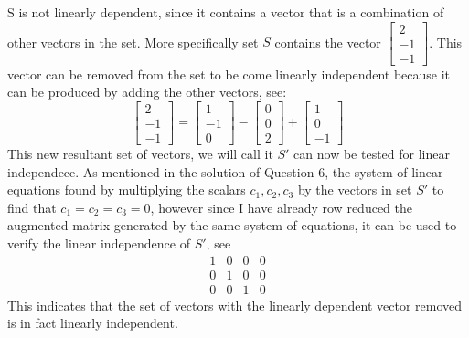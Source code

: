 \documentclass{report}
\begin{document}
\sol S is not linearly dependent, since it contains a vector that is a combination of other vectors in the set. More specifically set $S$ contains the vector 
$\begin{bmatrix} 2 \\ -1 \\ -1 \end{bmatrix}$. This vector can be removed from the set to be come linearly independent because it can be produced by adding the other vectors, see:
$$
\begin{bmatrix} 2 \\ -1 \\ -1 \end{bmatrix} =
\begin{bmatrix} 1 \\ -1 \\ 0 \end{bmatrix} -
\begin{bmatrix} 0 \\ 0 \\ 2 \end{bmatrix} +
\begin{bmatrix} 1 \\ 0 \\ -1 \end{bmatrix}
$$
This new resultant set of vectors, we will call it $S'$ can now be tested for linear independece. As mentioned in the solution of Question 6, the system of linear equations found by multiplying the scalars $c_1, c_2, c_3$ by the vectors in set $S'$ to find that $c_1 = c_2 = c_3 = 0$, however since I have already row reduced the augmented matrix generated by the same system of equations, it can be used to verify the linear independence of $S'$, see
$$
    \begin{array}{ccc|c}
        1 & 0 & 0 & 0 \\
        0 & 1 & 0 & 0 \\
        0 & 0 & 1 & 0
    \end{array}
$$
This indicates that the set of vectors with the linearly dependent vector removed is in fact linearly independent.
\end{document}
